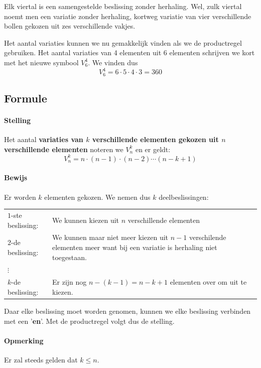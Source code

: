 \documentclass[12pt,a4paper,twoside]{article}
\begin{document}
Elk viertal is een samengestelde beslissing zonder herhaling. Wel, zulk viertal
noemt men een variatie zonder herhaling, kortweg variatie van vier verschillende bollen gekozen uit zes verschillende vakjes.

Het aantal variaties kunnen we nu gemakkelijk vinden als we de productregel gebruiken. Het aantal variaties van 4 elementen uit 6 elementen schrijven we kort met het nieuwe symbool $V^4_6$. We vinden dus
\[ V^4_6 = 6 \cdot 5 \cdot 4 \cdot 3 = 360 \]

\subsection{Formule}

\paragraph*{Stelling}
\begin{mdframed}
Het aantal {\bf variaties van $k$ verschillende elementen gekozen uit $n$ verschillende elementen} noteren we $V^k_n$ en er geldt:
$$V^k_n=n \cdot (n-1) \cdot (n-2) \cdots (n-k+1)$$
\end{mdframed}

\paragraph*{Bewijs}
Er worden $k$ elementen gekozen. We nemen dus $k$ deelbeslissingen:
\begin{center}
\begin{tabular}{lp{12cm}}
$1$-ste beslissing: & We kunnen kiezen uit $n$ verschillende elementen\\
$2$-de beslissing: & We kunnen maar niet meer kiezen uit $n-1$ verschilende elementen meer want bij een variatie is herhaling niet toegestaan.\\
$\vdots$ & \\
$k$-de beslissing: & Er zijn nog $n-(k-1)=n-k+1$ elementen over om uit te kiezen.
\end{tabular}
\end{center}
Daar elke beslissing moet worden genomen, kunnen we elke beslissing verbinden met een '{\bf en}'. Met de productregel volgt dus de stelling.


\paragraph*{Opmerking} Er zal steeds gelden dat $k\leq n$.
\end{document}
